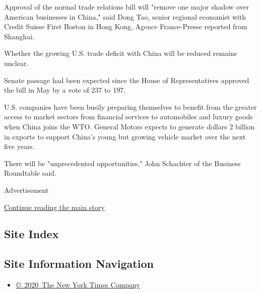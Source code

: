 Approval of the normal trade relations bill will "remove one major
shadow over American businesses in China," said Dong Tao, senior
regional economist with Credit Suisse First Boston in Hong Kong, Agence
France-Presse reported from Shanghai.

Whether the growing U.S. trade deficit with China will be reduced
remains unclear.

Senate passage had been expected since the House of Representatives
approved the bill in May by a vote of 237 to 197.

U.S. companies have been busily preparing themselves to benefit from the
greater access to market sectors from financial services to automobiles
and luxury goods when China joins the WTO. General Motors expects to
generate dollars 2 billion in exports to support China's young but
growing vehicle market over the next five years.

There will be "unprecedented opportunities," John Schachter of the
Business Roundtable said.

Advertisement

\protect\hyperlink{after-bottom}{Continue reading the main story}

\hypertarget{site-index}{%
\subsection{Site Index}\label{site-index}}

\hypertarget{site-information-navigation}{%
\subsection{Site Information
Navigation}\label{site-information-navigation}}

\begin{itemize}
\tightlist
\item
  \href{https://help.nytimes3xbfgragh.onion/hc/en-us/articles/115014792127-Copyright-notice}{©~2020~The
  New York Times Company}
\end{itemize}

